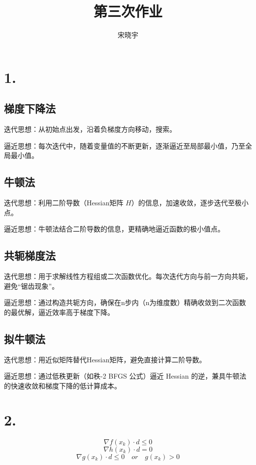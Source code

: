 \documentclass{article}
\title{\heiti 第三次作业}
\author{\kaishu 宋晓宇}
\date{}
\begin{document}
	\maketitle
	\section*{1.}

	\subsection*{梯度下降法}

	迭代思想：从初始点出发，沿着负梯度方向移动，搜索。

	逼近思想：每次迭代中，随着变量值的不断更新，逐渐逼近至局部最小值，乃至全局最小值。

	\subsection*{牛顿法}

	迭代思想：利用二阶导数（Hessian矩阵 $H$）的信息，加速收敛，逐步迭代至极小点。

	逼近思想：牛顿法结合二阶导数的信息，更精确地逼近函数的极小值点。

	\subsection*{共轭梯度法}

	迭代思想：用于求解线性方程组或二次函数优化。每次迭代方向与前一方向共轭，避免“锯齿现象”。
	
	逼近思想：通过构造共轭方向，确保在n步内（n为维度数）精确收敛到二次函数的最优解，逼近效率高于梯度下降。

	\subsection*{拟牛顿法}

	迭代思想：用近似矩阵替代Hessian矩阵，避免直接计算二阶导数。
	
	逼近思想：通过低秩更新（如秩-2 BFGS 公式）逼近 Hessian 的逆，兼具牛顿法的快速收敛和梯度下降的低计算成本。
  
    \section*{2.}

	\begin{equation*}
		\nabla f(x_k) \cdot d \leq 0
	\end{equation*}
	\begin{equation*}
		\nabla h(x_k) \cdot d  = 0
	\end{equation*}
	\begin{equation*}
		\nabla g(x_k) \cdot d \leq 0 \quad or \quad g(x_k) > 0 
    \end{equation*}
\end{document}
